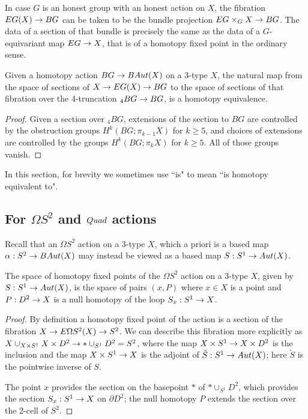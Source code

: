 \documentclass{amsart}
\begin{document}
\begin{remark}
In case $G$ is an honest group with an honest action on $X$, the fibration $EG(X) \rightarrow BG$ can be taken to be the bundle projection $EG \times_G X \rightarrow BG$.  The data of a section of that bundle is precisely the same as the data of a $G$-equivariant map $EG \rightarrow X$, that is of a homotopy fixed point in the ordinary sense.
\end{remark}

\begin{proposition} \label{prop-hofptrunc}
Given a homotopy action $BG \rightarrow BAut(X)$ on a 3-type $X$, the natural map from the space of sections of $X \rightarrow EG(X) \rightarrow BG$ to the space of sections of that fibration over the 4-truncation ${}_4 BG \rightarrow BG$, is a homotopy equivalence.
\end{proposition}
\begin{proof}
Given a section over ${}_4 BG$, extensions of the section to $BG$ are controlled by the obstruction groups $H^k(BG;\pi_{k-1} X)$ for $k \geq 5$, and choices of extensions are controlled by the groups $H^k(BG;\pi_k X)$ for $k \geq 5$.  All of those groups vanish.
\end{proof}

In this section, for brevity we sometimes use ``is" to mean ``is homotopy equivalent to".

\subsection{For $\Omega S^2$ and $Quad$ actions}

Recall that an $\Omega S^2$ action on a 3-type $X$, which a priori is a based map $\alpha: S^2 \rightarrow BAut(X)$ may instead be viewed as a based map $S: S^1 \rightarrow Aut(X)$.

\begin{proposition}
The space of homotopy fixed points of the $\Omega S^2$ action on a 3-type $X$, given by $S: S^1 \rightarrow Aut(X)$, is the space of pairs $(x,P)$ where $x \in X$ is a point and $P: D^2 \rightarrow X$ is a null homotopy of the loop $S_x: S^1 \rightarrow X$.
\end{proposition}
\begin{proof}
By definition a homotopy fixed point of the action is a section of the fibration $X \rightarrow E\Omega S^2(X) \rightarrow S^2$.  We can describe this fibration more explicitly as $X \cup_{X \times S^1} X \times D^2 \rightarrow \ast \cup_{S^1} D^2 = S^2$, where the map $X \times S^1 \rightarrow X \times D^2$ is the inclusion and the map $X \times S^1 \rightarrow X$ is the adjoint of $\tilde{S}: S^1 \rightarrow Aut(X)$; here $\tilde{S}$ is the pointwise inverse of $S$.  %

The point $x$ provides the section on the basepoint $\ast$ of $\ast \cup_{S^1} D^2$, which provides the section $S_x: S^1 \rightarrow X$ on $\partial D^2$; the null homotopy $P$ extends the section over the 2-cell of $S^2$.
\end{proof}
\end{document}
